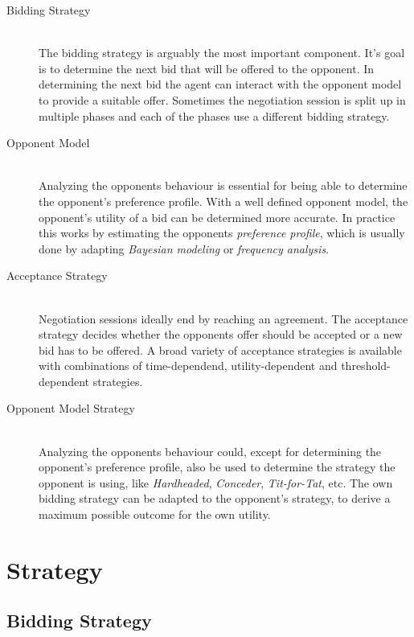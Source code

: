 \documentclass[a4paper,10pt]{article}
\begin{document}
\begin{description}
  \item[Bidding Strategy] \hfill \\
  The bidding strategy is arguably the most important component. It's goal is to determine the next bid that will be offered to the opponent. In determining the next bid the agent can interact with the opponent model to provide a suitable offer. Sometimes the negotiation session is split up in multiple phases and each of the phases use a different bidding strategy.

  \item[Opponent Model] \hfill \\
  Analyzing the opponents behaviour is essential for being able to determine the opponent's preference profile.  With a well defined opponent model, the opponent's utility of a bid can be determined more accurate. In practice this works by estimating the opponents \emph{preference profile}, which is usually done by adapting \emph{Bayesian modeling} or \emph{frequency analysis}. 

  \item[Acceptance Strategy] \hfill \\
  Negotiation sessions ideally end by reaching an agreement. The acceptance strategy decides whether the opponents offer should be accepted or a new bid has to be offered. A broad variety of acceptance strategies is available with combinations of time-dependend, utility-dependent and threshold-dependent strategies.

\item[Opponent Model Strategy] \hfill \\
  Analyzing the opponents behaviour could, except for determining the opponent's preference profile, also be used to determine the strategy the opponent is using, like \emph{Hardheaded}, \emph{Conceder}, \emph{Tit-for-Tat}, etc. The own bidding strategy can be adapted to the opponent's strategy, to derive a maximum possible outcome for the own utility.

\end{description}

\section{Strategy}
\label{sec:strategy}

\subsection{Bidding Strategy}
\label{sec:strategyBS}

\end{document}
